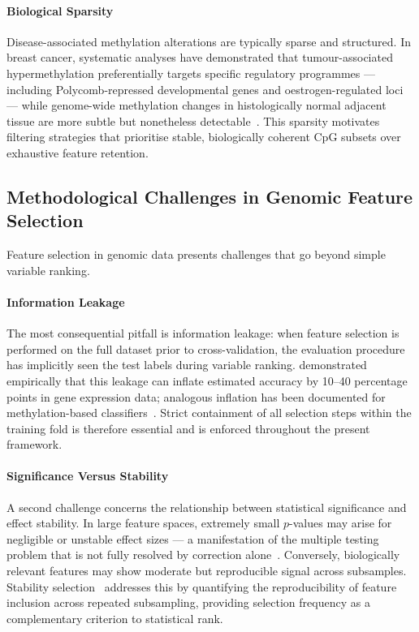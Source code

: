 \paragraph{Biological Sparsity}
Disease-associated methylation alterations are typically sparse and 
structured. In breast cancer, systematic analyses have demonstrated that 
tumour-associated hypermethylation preferentially targets specific regulatory 
programmes — including Polycomb-repressed developmental genes and 
oestrogen-regulated loci — while genome-wide methylation changes in 
histologically normal adjacent tissue are more subtle but nonetheless 
detectable~\cite{Teschendorff2016, Fleischer2017}. This sparsity 
motivates filtering strategies that prioritise stable, biologically 
coherent CpG subsets over exhaustive feature retention.

\subsection{Methodological Challenges in Genomic Feature Selection}
\label{subsec:fs_stability}
Feature selection in genomic data presents challenges that go beyond 
simple variable ranking.

\paragraph{Information Leakage}
The most consequential pitfall is information leakage: when feature 
selection is performed on the full dataset prior to cross-validation, 
the evaluation procedure has implicitly seen the test labels during 
variable ranking. \cite{Ambroise2002} demonstrated empirically that 
this leakage can inflate estimated accuracy by 10–40 percentage points 
in gene expression data; analogous inflation has been documented for 
methylation-based classifiers~\cite{Smialowski2010}. Strict containment 
of all selection steps within the training fold is therefore essential 
and is enforced throughout the present framework.

\paragraph{Significance Versus Stability}
A second challenge concerns the relationship between statistical 
significance and effect stability. In large feature spaces, extremely 
small $p$-values may arise for negligible or unstable effect sizes — a 
manifestation of the multiple testing problem that is not fully 
resolved by correction alone~\cite{Gelman2014}. Conversely, 
biologically relevant features may show moderate but reproducible 
signal across subsamples. Stability selection~\cite{Meinshausen2010} 
addresses this by quantifying the reproducibility of feature inclusion 
across repeated subsampling, providing selection frequency as a 
complementary criterion to statistical rank.

